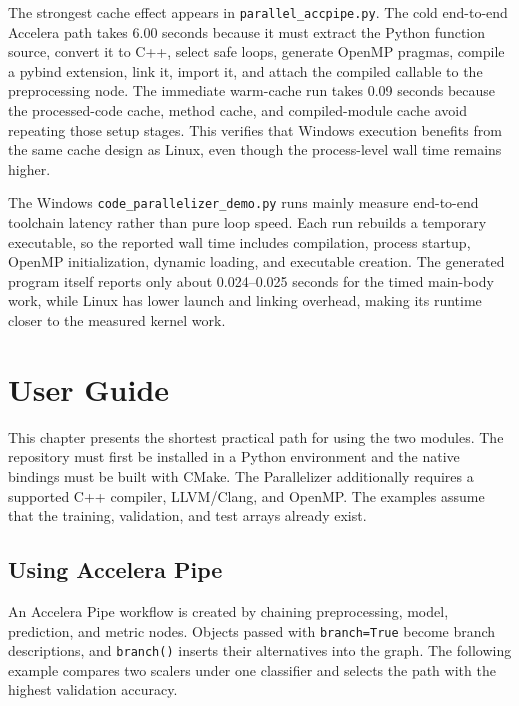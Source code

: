 \documentclass[12pt,a4paper,oneside]{report}
\begin{document}
The strongest cache effect appears in \texttt{parallel\_accpipe.py}. The cold
end-to-end Accelera path takes 6.00 seconds because it must extract the Python
function source, convert it to C++, select safe loops, generate OpenMP pragmas,
compile a pybind extension, link it, import it, and attach the compiled
callable to the preprocessing node. The immediate warm-cache run takes
0.09 seconds because the processed-code cache, method cache, and compiled-module
cache avoid repeating those setup stages. This verifies that Windows execution
benefits from the same cache design as Linux, even though the process-level
wall time remains higher.

The Windows \texttt{code\_parallelizer\_demo.py} runs mainly measure end-to-end toolchain latency rather than pure loop speed. 
Each run rebuilds a temporary executable, so the reported wall time includes compilation, process startup, 
OpenMP initialization, dynamic loading, and executable creation. 
The generated program itself reports only about 0.024--0.025 seconds for the timed main-body work, 
while Linux has lower launch and linking overhead, making its runtime closer to the measured kernel work.

\chapter{User Guide}
\label{chap:user-guide}

This chapter presents the shortest practical path for using the two modules.
The repository must first be installed in a Python environment and the native
bindings must be built with CMake. The Parallelizer additionally requires a
supported C++ compiler, LLVM/Clang, and OpenMP. The examples assume that the
training, validation, and test arrays already exist.

\section{Using Accelera Pipe}

An Accelera Pipe workflow is created by chaining preprocessing, model,
prediction, and metric nodes. Objects passed with \texttt{branch=True} become
branch descriptions, and \texttt{branch()} inserts their alternatives into the
graph. The following example compares two scalers under one classifier and
selects the path with the highest validation accuracy.
\end{document}
